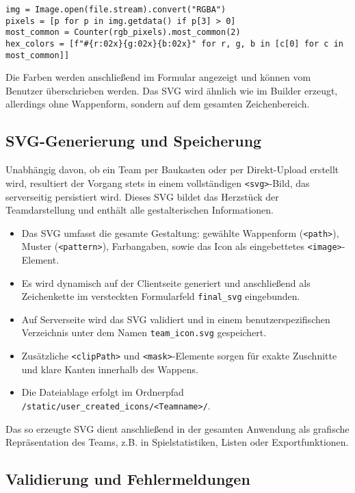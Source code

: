 \documentclass[12pt]{article}
\begin{document}
\begin{verbatim}
img = Image.open(file.stream).convert("RGBA")
pixels = [p for p in img.getdata() if p[3] > 0]
most_common = Counter(rgb_pixels).most_common(2)
hex_colors = [f"#{r:02x}{g:02x}{b:02x}" for r, g, b in [c[0] for c in most_common]]
\end{verbatim}

\noindent Die Farben werden anschließend im Formular angezeigt und können vom Benutzer überschrieben werden. Das SVG wird ähnlich wie im Builder erzeugt, allerdings ohne Wappenform, sondern auf dem gesamten Zeichenbereich.


\subsection{SVG-Generierung und Speicherung}

Unabhängig davon, ob ein Team per Baukasten oder per Direkt-Upload erstellt wird, resultiert der Vorgang stets in einem vollständigen \texttt{<svg>}-Bild, das serverseitig persistiert wird. Dieses SVG bildet das Herzstück der Teamdarstellung und enthält alle gestalterischen Informationen.

\begin{itemize}
  \item Das SVG umfasst die gesamte Gestaltung: gewählte Wappenform (\texttt{<path>}), Muster (\texttt{<pattern>}), Farbangaben, sowie das Icon als eingebettetes \texttt{<image>}-Element.
  \item Es wird dynamisch auf der Clientseite generiert und anschließend als Zeichenkette im versteckten Formularfeld \texttt{final\_svg} eingebunden.
  \item Auf Serverseite wird das SVG validiert und in einem benutzerspezifischen Verzeichnis unter dem Namen \texttt{team\_icon.svg} gespeichert.
  \item Zusätzliche \texttt{<clipPath>} und \texttt{<mask>}-Elemente sorgen für exakte Zuschnitte und klare Kanten innerhalb des Wappens.
  \item Die Dateiablage erfolgt im Ordnerpfad \texttt{/static/user\_created\_icons/<Teamname>/}.
\end{itemize}

\noindent Das so erzeugte SVG dient anschließend in der gesamten Anwendung als grafische Repräsentation des Teams, z.B. in Spielstatistiken, Listen oder Exportfunktionen.

\subsection{Validierung und Fehlermeldungen}
\end{document}
